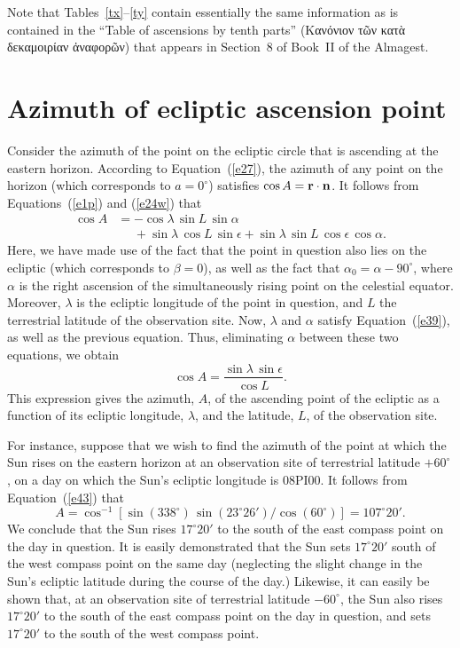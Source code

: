  Note that Tables~\ref{tx}--\ref{ty} contain essentially the same information as is contained in the ``Table of ascensions by tenth parts'' (Κανόνιον τῶν κατὰ δεκαμοιρίαν ἀναφορῶν)
 that appears in Section~8 of Book~II of the Almagest. 
 
\section{Azimuth of  ecliptic ascension point}
Consider the azimuth of the point on the ecliptic circle that is ascending at the
eastern horizon.
 According to Equation~(\ref{e27}),  the azimuth of any point on the horizon (which corresponds to $a=0^\circ$) satisfies $\cos A = {\bf r}\cdot {\bf n}$. It
 follows from Equations~(\ref{e1p}) and (\ref{e24w}) that
 \begin{align}
 \cos A&= -\cos\lambda\,\sin L\,\sin\alpha\nonumber\\[0.5ex]&\phantom{=} + 
 \sin\lambda\,\cos L\,\sin \epsilon + \sin\lambda\,\sin L\,\cos\epsilon\,\cos\alpha.
\end{align}
Here, we have made use of the fact that the point in question also lies on the
ecliptic (which corresponds to  $\beta=0$), as well as the fact that $\alpha_0=\alpha-90^\circ$,
where $\alpha$ is the right ascension of the simultaneously rising point on the celestial
equator. Moreover, $\lambda$ is the ecliptic longitude of the point in question, and $L$ the terrestrial latitude of the observation
site. 
Now, $\lambda$ and $\alpha$ satisfy Equation~(\ref{e39}), as well as the previous equation. Thus,
eliminating $\alpha$ between these two equations, we obtain
\begin{equation}\label{e43}
\cos A = \frac{\sin\lambda\,\sin\epsilon}{\cos L}.
\end{equation}
This expression gives the azimuth, $A$, of the ascending point of the ecliptic  as a function of
its ecliptic longitude, $\lambda$, and the latitude, $L$, of the
observation site.

For instance, suppose that we wish to find the azimuth of the point at which the Sun rises on
the eastern horizon at an observation site of terrestrial latitude $+60^\circ$, on a day on which the Sun's ecliptic longitude is 08PI00. It
follows from Equation~(\ref{e43}) that 
$$A= \cos^{-1}[\sin (338^\circ)\,\sin (23^\circ 26')/\cos (60^\circ)] = 107^\circ 20'.$$ We conclude  that the
Sun rises $17^\circ 20'$ to the south of the east compass point on the
day in question. It is easily demonstrated that the Sun sets $17^\circ 20'$ south of the west compass point
on the same day (neglecting the slight change in the Sun's ecliptic latitude during the course of the day.)
Likewise, it can easily be shown that, at an observation site of terrestrial latitude $-60^\circ$, the
Sun also rises $17^\circ 20'$ to the south of the east compass point on the day in question, and sets $17^\circ 20'$ to the south of
the west compass point. 
 
